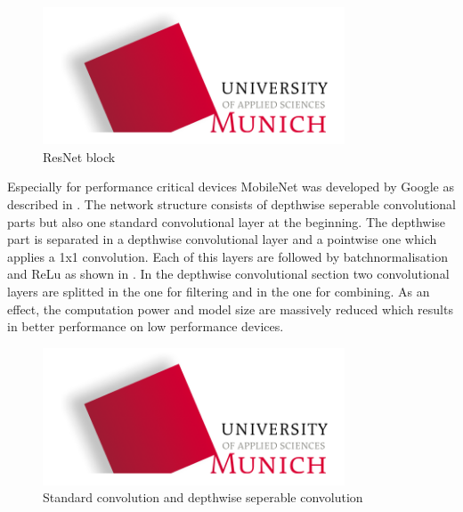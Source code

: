 \begin{figure}[htbp]
\includegraphics[width=0.8\textwidth]{includes/MUASlogo}
\caption[ResNet block]{ResNet block \citep{HE2015}}
\label{fig:FH-Logo6}
\end{figure}

Especially for performance critical devices MobileNet was developed by Google as described in \citet{Howard2017}.
The network structure consists of depthwise seperable convolutional parts but also one standard convolutional layer at the beginning. The depthwise part is separated in a depthwise convolutional layer and a pointwise one which applies a 1x1 convolution. Each of this layers are followed by batchnormalisation and ReLu as shown in . In the depthwise convolutional section two convolutional layers are splitted in the one for filtering and in the one for combining. As an effect, the computation power and model size are massively reduced which results in better performance on low performance devices.

\begin{figure}[htbp]
\includegraphics[width=0.8\textwidth]{includes/MUASlogo}
\caption[Standard convolution and depthwise seperable convolution]{Standard convolution and depthwise seperable convolution \citep{Howard2017}}
\label{fig:FH-Logo7}
\end{figure}
 		
